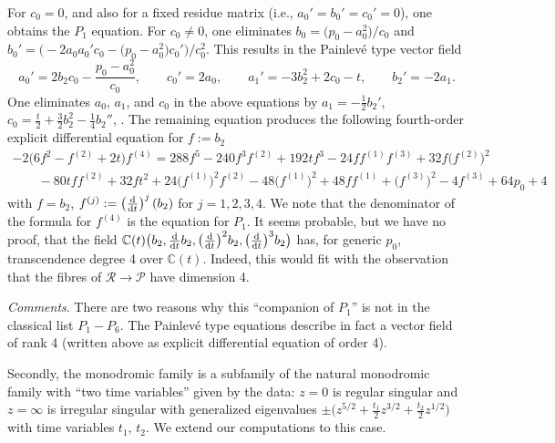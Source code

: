 \documentclass[pdftex]{sigma}
\numberwithin{equation}{section}
\begin{document}
 For $c_0=0$, and also for a fixed residue matrix (i.e., $a_0'=b_0'=c_0'=0$), one obtains the $P_1$ equation.
For $c_0\neq 0$, one eliminates $b_0=\bigl(p_0-a_0^2\bigr)/c_0$ and
$b_0'=\bigl(-2a_0a_0'c_0-\bigl(p_0-a_0^2\bigr)c_0'\bigr)/c_0^2$. This results in the Painlev\'e type vector field
\[a_0'=2b_2c_0-\frac{p_0-a_0^2}{c_0},\qquad c_0'=2a_0,\qquad a_1'=-3b_2^2+2c_0-t,\qquad b_2'=-2a_1.\]
One eliminates $a_0$, $a_1$, and $c_0$ in the above equations by
$a_1=-\frac{1}{2}b_2'$, $c_0=\frac{t}{2}+\frac{3}{2}b_2^2-\frac{1}{4}b_2''$, . The remaining equation produces the following fourth-order explicit differential equation for $f:=b_2$
 \begin{gather*}
 -2\bigl(6f^2-f^{(2)}+2t\bigr)f^{(4)}=288f^5-240f^3f^{(2)}+192tf^3-24ff^{(1)}f^{(3)}+32f\bigl(f^{(2)}\bigr)^2\\
 \qquad-80tff^{(2)}+32ft^2+
 24\bigl(f^{(1)}\bigr)^2f^{(2)} -48 \bigl(f^{(1)}\bigr)^2+48ff^{(1)}+\bigl(f^{(3)}\bigr)^2-4f^{(3)}+64p_0+4
\end{gather*}
with $f=b_2$, $f^{ (j) }:=\left( \frac{{\rm d}}{{\rm d}t} \right)^j (b_2)$ for $j=1,2,3,4$.
We note that the denominator of the formula for $f^{(4)}$ is the equation for $P_1$. It seems probable, but we have no proof, that
the field $\mathbb{C}(t)\bigl(b_2,\frac{{\rm d}}{{\rm d}t}b_2,\bigl(\frac{{\rm d}}{{\rm d}t}\bigr)^2b_2,\bigl(\frac{{\rm d}}{{\rm d}t}\bigr)^3b_2\bigr)$ has, for generic $p_0$, transcendence degree 4 over
$\mathbb{C}(t)$. Indeed, this would fit with the observation that the fibres of
$\mathcal{R}\rightarrow \mathcal{P}$ have dimension 4.

 {\it Comments}. There are two reasons why this ``companion of $P_1$'' is not in the classical list
$P_1-P_6$. The Painlev\'e type equations describe in fact a vector field of rank 4
(written above as explicit differential equation of order 4).

Secondly, the monodromic family is a subfamily of the natural monodromic family with ``two time variables''
given by the data: $z=0$ is regular singular and $z=\infty$ is irregular singular with generalized eigenvalues
$\pm \bigl(z^{5/2}+\frac{t_1}{2}z^{3/2}+\frac{t_2}{2}z^{1/2}\bigr)$ with time variables $t_1$, $t_2$. We extend our computations to this case.
\end{document}
